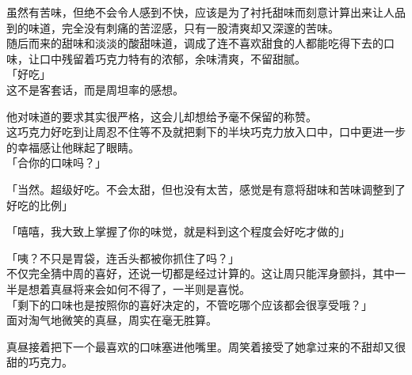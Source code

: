 虽然有苦味，但绝不会令人感到不快，应该是为了衬托甜味而刻意计算出来让人品到的味道，完全没有刺痛的苦涩感，只有一股清爽却又深邃的苦味。\\

随后而来的甜味和淡淡的酸甜味道，调成了连不喜欢甜食的人都能吃得下去的口味，让口中残留着巧克力特有的浓郁，余味清爽，不留甜腻。\\

「好吃」\\

这不是客套话，而是周坦率的感想。

他对味道的要求其实很严格，这会儿却想给予毫不保留的称赞。\\

这巧克力好吃到让周忍不住等不及就把剩下的半块巧克力放入口中，口中更进一步的幸福感让他眯起了眼睛。\\

「合你的口味吗？」

「当然。超级好吃。不会太甜，但也没有太苦，感觉是有意将甜味和苦味调整到了好吃的比例」

「嘻嘻，我大致上掌握了你的味觉，就是料到这个程度会好吃才做的」

「咦？不只是胃袋，连舌头都被你抓住了吗？」\\

不仅完全猜中周的喜好，还说一切都是经过计算的。这让周只能浑身颤抖，其中一半是想着真昼将来会如何不得了，一半则是喜悦。\\

「剩下的口味也是按照你的喜好决定的，不管吃哪个应该都会很享受哦？」\\

面对淘气地微笑的真昼，周实在毫无胜算。

真昼接着把下一个最喜欢的口味塞进他嘴里。周笑着接受了她拿过来的不甜却又很甜的巧克力。
